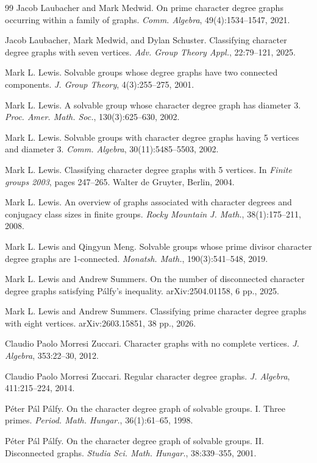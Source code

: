 \documentclass[11pt]{amsart}
\theoremstyle{definition}
\theoremstyle{remark}
\numberwithin{equation}{section}
\begin{document}
\begin{thebibliography}{99}
 Jacob Laubacher and Mark Medwid. On prime character degree graphs occurring within a family of graphs. \emph{Comm. Algebra}, 49(4):1534--1547, 2021.

 Jacob Laubacher, Mark Medwid, and Dylan Schuster. Classifying character degree graphs with seven vertices. \emph{Adv. Group Theory Appl.}, 22:79--121, 2025.

 Mark L. Lewis. Solvable groups whose degree graphs have two connected components. \emph{J. Group Theory}, 4(3):255--275, 2001.

 Mark L. Lewis. A solvable group whose character degree graph has diameter 3. \emph{Proc. Amer. Math. Soc.}, 130(3):625--630, 2002.

 Mark L. Lewis. Solvable groups with character degree graphs having 5 vertices and diameter 3. \emph{Comm. Algebra}, 30(11):5485--5503, 2002.

 Mark L. Lewis. Classifying character degree graphs with 5 vertices. In \emph{Finite groups 2003}, pages 247--265. Walter de Gruyter, Berlin, 2004.

 Mark L. Lewis. An overview of graphs associated with character degrees and conjugacy class sizes in finite groups. \emph{Rocky Mountain J. Math.}, 38(1):175--211, 2008.

 Mark L. Lewis and Qingyun Meng. Solvable groups whose prime divisor character degree graphs are 1-connected. \emph{Monatsh. Math.}, 190(3):541--548, 2019.

 Mark L. Lewis and Andrew Summers. On the number of disconnected character degree graphs satisfying P\'alfy’s inequality. arXiv:2504.01158, 6 pp., 2025.

 Mark L. Lewis and Andrew Summers. Classifying prime character degree graphs with eight vertices. arXiv:2603.15851, 38 pp., 2026.

 Claudio Paolo Morresi Zuccari. Character graphs with no complete vertices. \emph{J. Algebra}, 353:22--30, 2012.

 Claudio Paolo Morresi Zuccari. Regular character degree graphs. \emph{J. Algebra}, 411:215--224, 2014.

 P\'eter P\'al P\'alfy. On the character degree graph of solvable groups. I. Three primes. \emph{Period. Math. Hungar.}, 36(1):61--65, 1998.

  P\'eter P\'al P\'alfy. On the character degree graph of solvable groups. II. Disconnected graphs. \emph{Studia Sci. Math. Hungar.}, 38:339--355, 2001.


\end{thebibliography}
\end{document}
